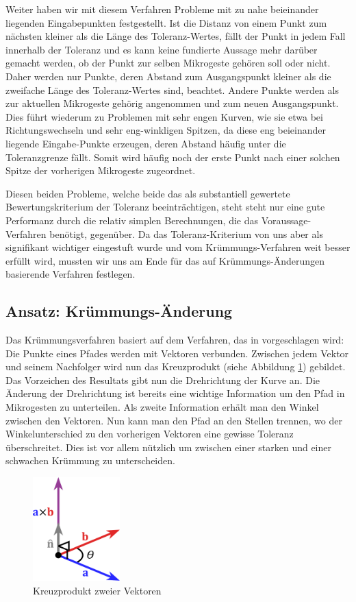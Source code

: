 Weiter haben wir mit diesem Verfahren Probleme mit zu nahe beieinander liegenden Eingabepunkten festgestellt. Ist die Distanz von einem Punkt zum nächsten kleiner als die Länge des Toleranz-Wertes, fällt der Punkt in jedem Fall innerhalb der Toleranz und es kann keine fundierte Aussage mehr darüber gemacht werden, ob der Punkt zur selben Mikrogeste gehören soll oder nicht. Daher werden nur Punkte, deren Abstand zum Ausgangspunkt kleiner als die zweifache Länge des Toleranz-Wertes sind, beachtet. Andere Punkte werden als zur aktuellen Mikrogeste gehörig angenommen und zum neuen Ausgangspunkt. Dies führt wiederum zu Problemen mit sehr engen Kurven, wie sie etwa bei Richtungswechseln und sehr eng-winkligen Spitzen, da diese eng beieinander liegende Eingabe-Punkte erzeugen, deren Abstand häufig unter die Toleranzgrenze fällt. Somit wird häufig noch der erste Punkt nach einer solchen Spitze der vorherigen Mikrogeste zugeordnet.

Diesen beiden Probleme, welche beide das als substantiell gewertete Bewertungskriterium der Toleranz beeinträchtigen, steht steht nur eine gute Performanz durch die relativ simplen Berechnungen, die das Voraussage-Verfahren benötigt, gegenüber. Da das Toleranz-Kriterium von uns aber als signifikant wichtiger eingestuft wurde und vom Krümmungs-Verfahren weit besser erfüllt wird, mussten wir uns am Ende für das auf Krümmungs-Änderungen basierende Verfahren festlegen.


\subsection{Ansatz: Krümmungs-Änderung}
Das Krümmungsverfahren basiert auf dem Verfahren, das in \cite{zeichenerkennung_pa} vorgeschlagen wird: Die Punkte eines Pfades werden mit Vektoren verbunden. Zwischen jedem Vektor und seinem Nachfolger wird nun das Kreuzprodukt (siehe Abbildung \ref{kreuzprodukt}) gebildet. Das Vorzeichen des Resultats gibt nun die Drehrichtung der Kurve an. Die Änderung der Drehrichtung ist bereits eine wichtige Information um den Pfad in Mikrogesten zu unterteilen.
Als zweite Information erhält man den Winkel zwischen den Vektoren. Nun kann man den Pfad an den Stellen trennen, wo der Winkelunterschied zu den vorherigen Vektoren eine gewisse Toleranz überschreitet. Dies ist vor allem nützlich um zwischen einer starken und einer schwachen Krümmung zu unterscheiden.

\begin{figure}[h!]
  \centering
    \includegraphics[width=0.3\textwidth]{./img/crossproduct.pdf}
  \caption{Kreuzprodukt zweier Vektoren}
  \label{kreuzprodukt}
\end{figure}

